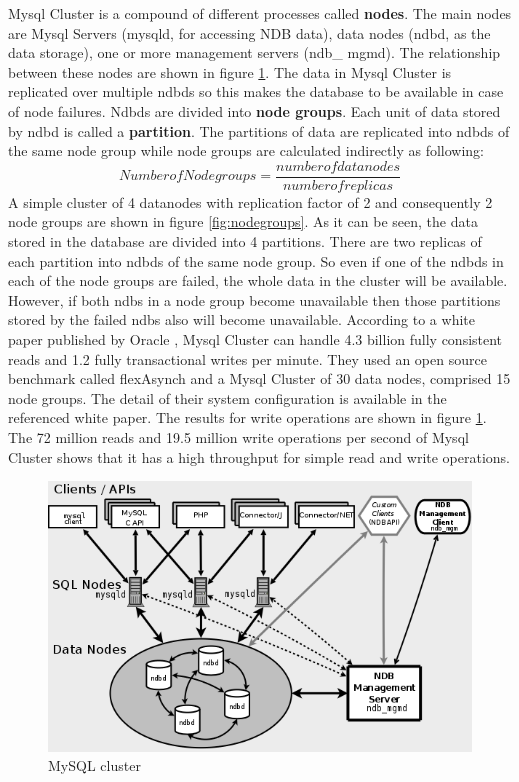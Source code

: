 Mysql  Cluster  is   a  compound  of  different  processes   called  \textbf{nodes}.  The  main  nodes   are
Mysql  Servers   (mysqld,  for  accessing  NDB  data),  data  nodes   (ndbd,  as   the  data  storage),
one  or  more  management  servers   (ndb\_ mgmd).  The  relationship  between  these  nodes   are
shown in figure \ref{fig:mysqlCluster}.
The  data  in Mysql Cluster is  replicated over multiple ndbds  so this  makes  the database to be
available  in  case  of  node  failures.  Ndbds   are  divided  into \textbf{node groups}.  Each  unit  of  data
stored  by   ndbd  is   called  a  \textbf{partition}.  The  partitions   of  data  are  replicated  into  ndbds   of  the
same node group while node groups are calculated indirectly as following:
$$Number of Node groups  = \frac{number of  datanodes}{number of  replicas} $$
A  simple  cluster  of  4  datanodes   with  replication  factor  of  2  and  consequently  2 node groups
are shown in figure \ref{fig:nodegroups}.
As   it  can  be  seen,  the  data stored in the database are divided into 4 partitions. There are two
replicas   of  each  partition  into  ndbds   of  the  same  node  group.  So  even  if  one  of the ndbds  in
each  of  the  node  groups   are  failed, the whole data in the cluster will be available. However, if
both  ndbs   in a node group become unavailable then those partitions  stored by  the failed ndbs
also will become unavailable.
According  to  a  white  paper  published  by   Oracle  ,  Mysql  Cluster  can  handle  4.3
billion  fully   consistent  reads   and  1.2  fully  transactional writes  per minute. They  used an open
source  benchmark   called  flexAsynch  and  a  Mysql  Cluster  of  30  data  nodes,  comprised  15
node  groups.  The  detail  of  their  system   configuration  is   available  in  the  referenced  white
paper. The results for write operations are shown in figure \ref{fig:mysqlCluster}.
The  72  million  reads   and  19.5  million  write  operations   per  second  of  Mysql  Cluster  shows
that it has a high throughput for simple read and write operations.
\pagebreak
\begin{figure}[h!]
\centering  
 \includegraphics[scale=0.65]{figs/preliminar/mysql_cluster.png}
  \caption{MySQL cluster}
  \label{fig:mysqlCluster}
\end{figure}

